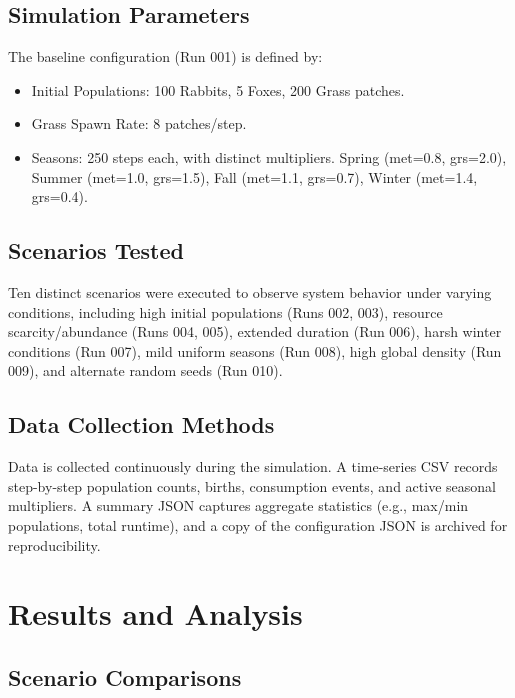 \documentclass[12pt]{article}
\begin{document}
\subsection{Simulation Parameters}
The baseline configuration (Run 001) is defined by:
\begin{itemize}
    \item Initial Populations: 100 Rabbits, 5 Foxes, 200 Grass patches.
    \item Grass Spawn Rate: 8 patches/step.
    \item Seasons: 250 steps each, with distinct multipliers. Spring (met=0.8, grs=2.0), Summer (met=1.0, grs=1.5), Fall (met=1.1, grs=0.7), Winter (met=1.4, grs=0.4).
\end{itemize}

\subsection{Scenarios Tested}
Ten distinct scenarios were executed to observe system behavior under varying conditions, including high initial populations (Runs 002, 003), resource scarcity/abundance (Runs 004, 005), extended duration (Run 006), harsh winter conditions (Run 007), mild uniform seasons (Run 008), high global density (Run 009), and alternate random seeds (Run 010).

\subsection{Data Collection Methods}
Data is collected continuously during the simulation. A time-series CSV records step-by-step population counts, births, consumption events, and active seasonal multipliers. A summary JSON captures aggregate statistics (e.g., max/min populations, total runtime), and a copy of the configuration JSON is archived for reproducibility.

\section{Results and Analysis}
\label{sec:results}

\subsection{Scenario Comparisons}
\end{document}
